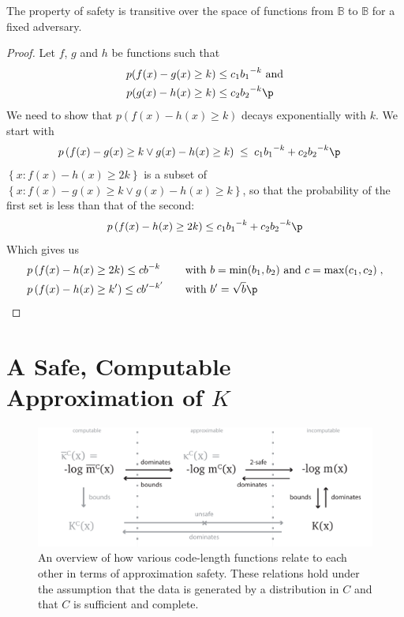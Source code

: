 \begin{lemma}
The property of safety is transitive over the space of functions from $\mathbb B$ to $\mathbb B$ for a fixed adversary.
\label{lemma:reflexitvity}
\end{lemma}
\begin{proof} Let $f$, $g$ and $h$ be functions such that 
\begin{align*}
p(f(x) - g(x) \geq k) &\leq c_1{b_1}^{-k} \text{ and}\\
p(g(x) - h(x) \geq k) &\leq c_2{b_2}^{-k} \p
\end{align*}
We need to show that $p(f(x) - h(x) \geq k)$ decays exponentially with $k$. We start with
\begin{align*}
p\left(f(x) - g(x) \geq k \vee g(x) - h(x) \geq k\right)\;&\leq\;c_1{b_1}^{-k} + c_2{b_2}^{-k}\p
\end{align*}
$\left\{x : f(x) - h(x) \geq 2k\right\}$ is a subset of $\left\{x : f(x) - g(x) \geq k\vee g(x) - h(x) \geq k\right\}$, so that the probability of the first set is less than that of the second:
\begin{align*}
p\left(f(x) - h(x) \geq 2k\right) \leq c_1{b_1}^{-k} + c_2{b_2}^{-k} \p
\end{align*}
Which gives us \belowdisplayskip=-12pt
\begin{align*}
&p\left(f(x) - h(x) \geq 2k\right)\leq cb^{-k} \quad&& \text{with $b=\min(b_1, b_2)$ and $c = \max(c_1, c_2)$} \;,\\
&p\left(f(x) - h(x) \geq k'\right)\leq cb'^{-k'} \quad&& \text{with $b'=\sqrt{b}$}\p
\end{align*} 
\end{proof}

\section{A Safe, Computable Approximation of $K$}

\begin{figure}[tb]
  \centering
  \includegraphics[width=\textwidth]{./images/approximation-map.pdf}
  \caption{\small An overview of how various code-length functions relate to each other in terms of approximation safety. These relations hold under the assumption that the data is generated by a distribution in $C$ and that $C$ is sufficient and complete.}
  \label{fig:approximation-map}
\end{figure}

